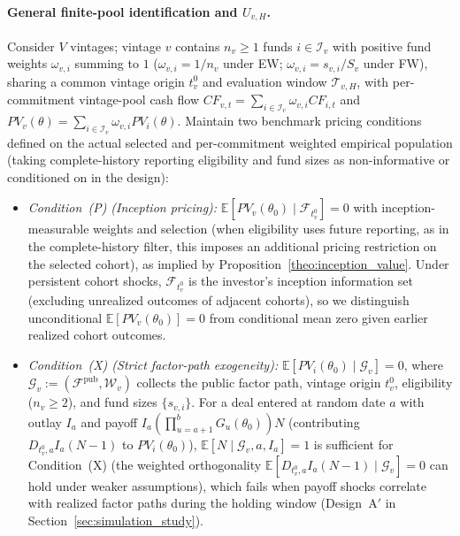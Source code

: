 \documentclass[12pt]{article}
\begin{document}
\paragraph{General finite-pool identification and $U_{v,H}$.}
Consider $V$ vintages; vintage $v$ contains $n_v \ge 1$ funds $i \in \mathcal{I}_v$ with positive fund weights $\omega_{v,i}$ summing to $1$ ($\omega_{v,i} = 1/n_v$ under EW; $\omega_{v,i} = s_{v,i}/S_v$ under FW), sharing a common vintage origin $t_v^0$ and evaluation window $\mathcal{T}_{v,H}$, with per-commitment vintage-pool cash flow $CF_{v,t} = \sum_{i\in\mathcal{I}_v} \omega_{v,i} CF_{i,t}$ and $PV_v(\theta) = \sum_{i\in\mathcal{I}_v}\omega_{v,i} PV_i(\theta)$.
Maintain two benchmark pricing conditions defined on the actual selected and per-commitment weighted empirical population (taking complete-history reporting eligibility and fund sizes as non-informative or conditioned on in the design):
\begin{itemize}
  \item \emph{Condition~(P) (Inception pricing):} $\mathbb{E}[PV_v(\theta_0) \mid \mathcal{F}_{t_v^0}] = 0$ with inception-measurable weights and selection (when eligibility uses future reporting, as in the complete-history filter, this imposes an additional pricing restriction on the selected cohort), as implied by Proposition~\ref{theo:inception_value}. Under persistent cohort shocks, $\mathcal{F}_{t_v^0}$ is the investor's inception information set (excluding unrealized outcomes of adjacent cohorts), so we distinguish unconditional $\mathbb{E}[PV_v(\theta_0)] = 0$ from conditional mean zero given earlier realized cohort outcomes.
  \item \emph{Condition~(X) (Strict factor-path exogeneity):} $\mathbb{E}[PV_i(\theta_0) \mid \mathcal{G}_v] = 0$, where $\mathcal{G}_v := (\mathcal{F}^{\mathrm{pub}}, \mathcal{W}_v)$ collects the public factor path, vintage origin $t_v^0$, eligibility ($n_v \ge 2$), and fund sizes $\{s_{v,i}\}$. For a deal entered at random date $a$ with outlay $I_a$ and payoff $I_a (\prod_{u=a+1}^b G_u(\theta_0)) N$ (contributing $D_{t_v^0,a} I_a (N - 1)$ to $PV_i(\theta_0)$), $\mathbb{E}[N \mid \mathcal{G}_v, a, I_a] = 1$ is sufficient for Condition~(X) (the weighted orthogonality $\mathbb{E}[D_{t_v^0,a} I_a (N-1)\mid \mathcal{G}_v] = 0$ can hold under weaker assumptions), which fails when payoff shocks correlate with realized factor paths during the holding window (Design~A$'$ in Section~\ref{sec:simulation_study}).
\end{itemize}
\end{document}
